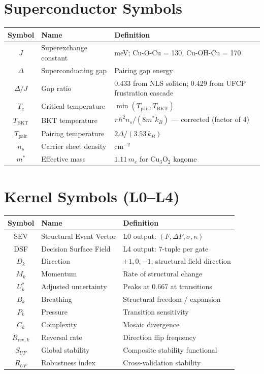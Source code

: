 \documentclass[11pt, a4paper]{article}
\begin{document}
\section{Superconductor Symbols}

\begin{center}
\begin{longtable}{@{}clp{7cm}@{}}
\toprule
\textbf{Symbol} & \textbf{Name} & \textbf{Definition} \\
\midrule
\endhead
$J$ & Superexchange constant & meV; Cu-O-Cu = 130, Cu-OH-Cu = 170 \\
$\Delta$ & Superconducting gap & Pairing gap energy \\
$\Delta/J$ & Gap ratio & 0.433 from NLS soliton; 0.429 from UFCP
  frustration cascade \\
$T_c$ & Critical temperature & $\min(T_{\text{pair}}, T_{\text{BKT}})$ \\
$T_{\text{BKT}}$ & BKT temperature &
  $\pi\hbar^2 n_s/(8m^*k_B)$ --- corrected (factor of 4) \\
$T_{\text{pair}}$ & Pairing temperature &
  $2\Delta/(3.53\,k_B)$ \\
$n_s$ & Carrier sheet density & cm$^{-2}$ \\
$m^*$ & Effective mass & $1.11\,m_e$ for Cu$_3$O$_2$ kagome \\
\bottomrule
\end{longtable}
\end{center}

\section{Kernel Symbols (L0--L4)}

\begin{center}
\begin{longtable}{@{}clp{7cm}@{}}
\toprule
\textbf{Symbol} & \textbf{Name} & \textbf{Definition} \\
\midrule
\endhead
SEV & Structural Event Vector & L0 output:
  $(F, \Delta F, \sigma, \kappa)$ \\
DSF & Decision Surface Field & L4 output: 7-tuple per gate \\
$D_k$ & Direction & $+1, 0, -1$; structural field direction \\
$M_k$ & Momentum & Rate of structural change \\
$U^*_k$ & Adjusted uncertainty & Peaks at 0.667 at transitions \\
$B_k$ & Breathing & Structural freedom / expansion \\
$P_k$ & Pressure & Transition sensitivity \\
$C_k$ & Complexity & Mosaic divergence \\
$R_{\text{rev},k}$ & Reversal rate & Direction flip frequency \\
$S_{UF}$ & Global stability & Composite stability functional \\
$R_{UF}$ & Robustness index & Cross-validation stability \\
\bottomrule
\end{longtable}
\end{center}
\end{document}
